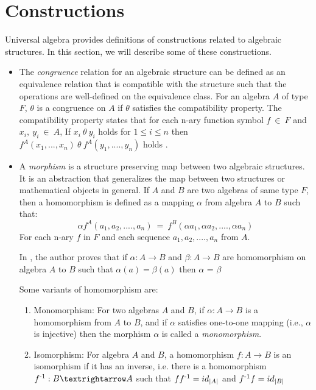 \section{Constructions}
Universal algebra provides definitions of constructions related to algebraic
structures. In this section, we will describe some of these constructions. 
\begin{itemize}
    \item The \textit{congruence} relation for an algebraic structure can be
    defined as an equivalence relation that is compatible with the structure
    such that the operations are well-defined on the equivalence class. For an
    algebra $A$ of type $F$, $\theta$ is a congruence on $A$ if $\theta$
    satisfies the compatibility property. The compatibility property states that
    for each n-ary function symbol $f \ \in\ F$ and $x_i,\ y_i\ \in\ A$, If
    $x_i\ \theta\ y_i$ holds for \(1\leq i \leq n\) then $f^{A}(x_1,...,x_n)\
    \theta\ f^{A}(y_1,....,y_n)$ holds \cite{sankappanavar1981course}.

    \item A \textit{morphism} is a structure preserving map between two
    algebraic structures. It is an abstraction that generalizes the map between
    two structures or mathematical objects in general. If $A$ and $B$ are two
    algebras of same type $F$, then a homomorphism is defined as a mapping
    \(\alpha\) from algebra $A$ to $B$ such that: \[ \alpha
    f^{A}(a_1,a_2,....,a_n)\ =\ f^{B}(\alpha a_1,\alpha a_2,....,\alpha a_n)\]
    For each n-ary $f$ in $F$ and each sequence $a_1,a_2,....,a_n$ from $A$.
   
    In \cite{sankappanavar1981course}, the author proves that if \(\alpha: A
    \rightarrow B\) and \(\beta: A \rightarrow B\) are homomorphism on algebra
    $A$ to $B$ such that \(\alpha (a) = \beta (a) \) then \(\alpha\) = \(\beta\)

    Some variants of homomorphism are:
    \begin{enumerate}
        \item  Monomorphism: For two algebras $A$ and $B$, if \(\alpha : A
        \rightarrow B \) is a homomorphism from $A$ to $B$, and if \(\alpha\)
        satisfies one-to-one mapping (i.e., \(\alpha\) is injective) then the
        morphism \(\alpha\) is called a \textit{monomorphism}.

        \item Isomorphism: For algebra $A$ and $B$, a homomorphism $f:A → B$
        is an isomorphism if it has an inverse, i.e. there is a homomorphism
        $f\textsuperscript{-1}:B → A$ such that $ff\textsuperscript{-1} = id_{|A|}$ and $f\textsuperscript{-1}f = id_{|B|}$ 


\end{enumerate}
\end{itemize}
